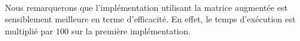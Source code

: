 

\\
Nous remarquerons que l'implémentation utilisant la matrice augmentée est sensiblement meilleure en terme d'efficacité. En effet, le temps d'exécution est multiplié par $100$ sur la première implémentation.